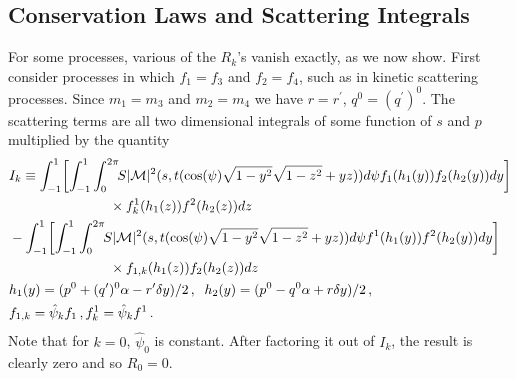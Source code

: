 \subsection{Conservation Laws and Scattering Integrals}
For some processes, various of the $R_k$'s vanish exactly, as we now show. First consider processes in which $f_1=f_3$ and $f_2=f_4$, such as in kinetic scattering processes. Since $m_1=m_3$ and $m_2=m_4$ we have $r=r^{\prime}$, $q^0=(q^{\prime})^0$.  The scattering terms are all two dimensional integrals of some function of $s$ and $p$ multiplied by the quantity
\begin{align}
&I_k
\equiv\int_{-1}^1\! \left[\int_{-1}^1\int_0^{2\pi}\!\!S|\mathcal{M}|^2 (s,t(\cos(\psi)\sqrt{1-y^2}\sqrt{1-z^2}+yz))d\psi f_1(h_1(y))f_2(h_2(y)) dy\right]\\
&\hspace{26mm}\times f_k^1(h_1(z))f^2(h_2(z))dz\notag\\
&-\int_{-1}^1 \!\left[\int_{-1}^1\int_0^{2\pi}\!\!S|\mathcal{M}|^2 (s,t(\cos(\psi)\sqrt{1-y^2}\sqrt{1-z^2}+yz))d\psi f^1(h_1(y))f^2(h_2(y)) dy\right] \notag\\
&\hspace{26mm}\times f_{1,k}(h_1(z))f_2(h_2(z))dz\notag\\
&h_1(y)=(p^0+(q^{\prime})^0\alpha-r^{\prime}\delta y)/2\,,\hspace{2mm} h_2(y)=(p^0-q^0\alpha+r\delta y)/2\,,\notag\\
&f_{1,k}=\hat\psi_k f_1\,, f^1_k=\hat\psi_k f^1\,.\notag
\end{align}
Note that for $k=0$, $\hat\psi_0$ is constant.  After factoring it out of $I_k$, the result is clearly zero and so $R_0=0$.  

